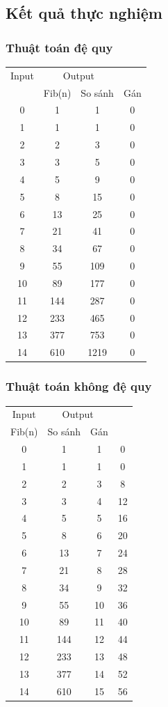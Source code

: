 \documentclass{article}
\begin{document}
\subsection{Kết quả thực nghiệm}
\subsubsection{Thuật toán đệ quy}
\begin{tabular}{c|c c c}
	Input & \multicolumn{2}{c}{Output}\\
	&Fib(n) & So sánh & Gán\\
	\hline
	0 & 1 & 1 & 0\\
	1 & 1 & 1 & 0\\
	2 & 2 & 3 & 0\\
	3 & 3 & 5 & 0\\
	4 & 5 & 9 & 0\\
	5 & 8 & 15 & 0\\
	6 & 13 & 25 & 0\\
	7 & 21 & 41 & 0\\
	8 & 34 & 67 & 0\\
	9 & 55 & 109 & 0\\
	10 & 89 & 177 & 0\\
	11 & 144 & 287 & 0\\
	12 & 233 & 465 & 0\\
	13 & 377 & 753 & 0\\
	14 & 610 & 1219 & 0\\
\end{tabular}


\subsubsection{Thuật toán không đệ quy}
\begin{tabular}{c|c c c}
	Input & \multicolumn{2}{c}{Output}\\
	Fib(n) & So sánh & Gán\\
	\hline
	0 & 1 & 1 & 0\\
	1 & 1 & 1 & 0\\
	2 & 2 & 3 & 8\\
	3 & 3 & 4 & 12\\
	4 & 5 & 5 & 16\\
	5 & 8 & 6 & 20\\
	6 & 13 & 7 & 24\\
	7 & 21 & 8 & 28\\
	8 & 34 & 9 & 32\\
	9 & 55 & 10 & 36\\
	10 & 89 & 11 & 40\\
	11 & 144 & 12 & 44\\
	12 & 233 & 13 & 48\\
	13 & 377 & 14 & 52\\
	14 & 610 & 15 & 56\\
\end{tabular}
\end{document}
